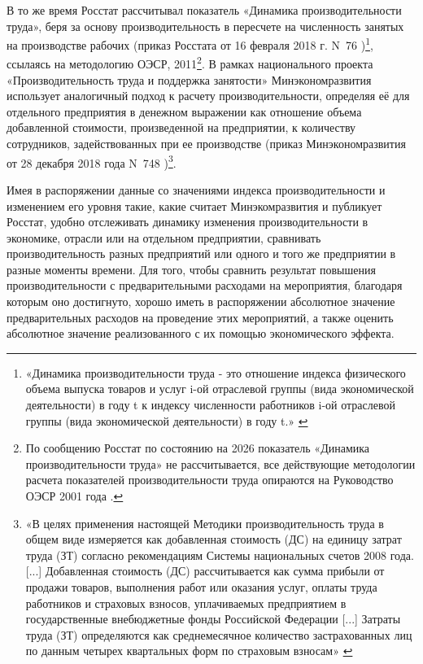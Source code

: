 \documentclass{article}
\begin{document}
В то же время Росстат рассчитывал показатель «Динамика производительности труда», беря за основу производительность в пересчете на численность занятых на производстве рабочих (приказ Росстата от 16 февраля 2018 г. N~76 \cite{rosstat_prikaz76_16022018_LabourProductivityDynamics})\footnote{«Динамика производительности труда - это отношение индекса физического объема выпуска товаров и услуг i-ой отраслевой группы (вида экономической деятельности) в году t к индексу численности работников i-ой отраслевой группы (вида экономической деятельности) в году t.» \cite{rosstat_prikaz76_16022018_LabourProductivityDynamics}}, ссылаясь на методологию ОЭСР, 2011\footnote{По сообщению Росстат по состоянию на 2026 показатель «Динамика производительности труда» не рассчитывается, все действующие методологии расчета показателей производительности труда опираются на Руководство ОЭСР 2001 года \cite{oecdLabourProductivityManual2001}.}. В рамках национального проекта «Производительность труда и поддержка занятости» Минэкономразвития использует аналогичный подход к расчету производительности, определяя её для отдельного предприятия в денежном выражении как отношение объема добавленной стоимости, произведенной на предприятии, к количеству сотрудников, задействованных при ее производстве (приказ Минэкономразвития от 28 декабря 2018 года N~748 \cite{mineco_prikaz748_28022018_LabourProductivityMethod})\footnote{«В целях применения настоящей Методики производительность труда в общем виде измеряется как добавленная стоимость (ДС) на единицу затрат труда (ЗТ) согласно рекомендациям Системы национальных счетов 2008 года. [...] Добавленная стоимость (ДС) рассчитывается как сумма прибыли от продажи товаров, выполнения работ или оказания услуг, оплаты труда работников и страховых взносов, уплачиваемых предприятием в государственные внебюджетные фонды Российской Федерации [...] Затраты труда (ЗТ) определяются как среднемесячное количество застрахованных лиц по данным четырех квартальных форм по страховым взносам» \cite{mineco_prikaz748_28022018_LabourProductivityMethod}}.

Имея в распоряжении данные со значениями индекса производительности и изменением его уровня такие, какие считает Минэкомразвития и публикует Росстат, удобно отслеживать динамику изменения производительности в экономике, отрасли или на отдельном предприятии, сравнивать производительность разных предприятий или одного и того же предприятии в разные моменты времени. Для того, чтобы сравнить результат повышения производительности с предварительными расходами на мероприятия, благодаря которым оно достигнуто, хорошо иметь в распоряжении абсолютное значение предварительных расходов на проведение этих мероприятий, а также оценить абсолютное значение реализованного с их помощью экономического эффекта.
\end{document}
